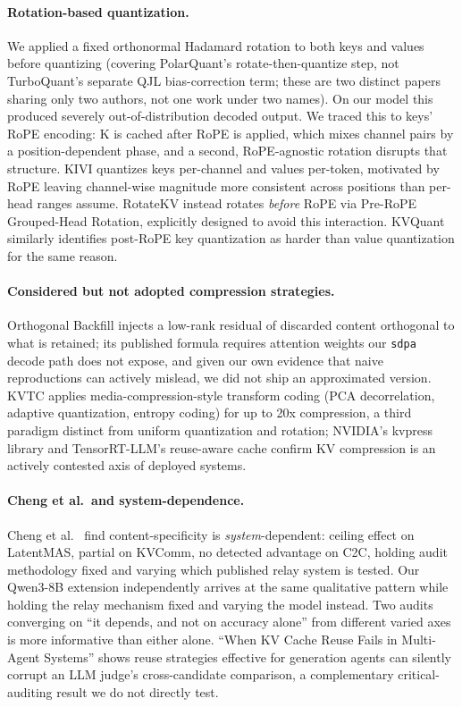 \documentclass[11pt]{article}
\begin{document}
\paragraph{Rotation-based quantization.}
\label{app:rotation}
We applied a fixed orthonormal
Hadamard rotation to both keys and values before quantizing
(covering PolarQuant's \citep{polarquant2026} rotate-then-quantize
step, not TurboQuant's \citep{turboquant2026} separate QJL
bias-correction term; these are two distinct papers sharing only two
authors, not one work under two names). On our model this produced
severely out-of-distribution decoded output. We traced this to keys'
RoPE encoding: K is cached after RoPE is applied, which mixes channel
pairs by a position-dependent phase, and a second, RoPE-agnostic
rotation disrupts that structure. KIVI \citep{kivi2024} quantizes keys
per-channel and values per-token, motivated by RoPE leaving channel-wise
magnitude more consistent across positions than per-head ranges assume.
RotateKV \citep{rotatekv2025} instead rotates \emph{before} RoPE via
Pre-RoPE Grouped-Head Rotation, explicitly designed to avoid this
interaction. KVQuant \citep{kvquant2024} similarly identifies post-RoPE
key quantization as harder than value quantization for the same reason.

\paragraph{Considered but not adopted compression strategies.}
Orthogonal Backfill \citep{orthobackfill2026} injects a low-rank
residual of discarded content orthogonal to what is retained; its
published formula requires attention weights our \texttt{sdpa} decode
path does not expose, and given our own evidence that naive
reproductions can actively mislead, we did not ship an approximated
version. KVTC \citep{kvtc2026} applies media-compression-style
transform coding (PCA decorrelation, adaptive quantization, entropy
coding) for up to 20x compression, a third paradigm distinct from
uniform quantization and rotation; NVIDIA's kvpress library and
TensorRT-LLM's reuse-aware cache confirm KV compression is an actively
contested axis of deployed systems.

\paragraph{Cheng et al.\ and system-dependence.} Cheng et al.\
\citep{latentcommpay2026} find content-specificity is
\emph{system}-dependent: ceiling effect on LatentMAS, partial on
KVComm, no detected advantage on C2C, holding audit methodology fixed
and varying which published relay system is tested. Our Qwen3-8B
extension independently arrives at the same qualitative pattern while
holding the relay mechanism fixed and varying the model instead. Two
audits converging on ``it depends, and not on accuracy alone'' from
different varied axes is more informative than either alone. ``When KV
Cache Reuse Fails in Multi-Agent Systems'' \citep{kvreusefails2026}
shows reuse strategies effective for generation agents can silently
corrupt an LLM judge's cross-candidate comparison, a complementary
critical-auditing result we do not directly test.
\end{document}
